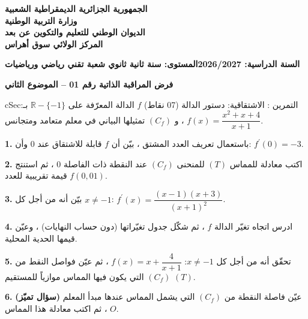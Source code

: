\documentclass[12pt,a4paper]{article}
\newenvironment{BOX}[2]{\begin{otherlanguage}{english}\begin{arbox}{#1}{#2}}{\end{arbox}\end{otherlanguage}}
\newcounter{exo}
\newenvironment{tamrin}[1]{\stepcounter{exo}\begin{BOX}{cSec}{التمرين \theexo: #1}}{\end{BOX}}
\newenvironment{LTR}{\begin{otherlanguage}{english}}{\end{otherlanguage}}
\newcommand{\R}{\mathbb{R}}
\newcommand{\QQ}[1]{\par\smallskip\textbf{#1.} }
\begin{document}
\begin{center}
{\large\bfseries الجمهورية الجزائرية الديمقراطية الشعبية}\\[2pt]
{\bfseries وزارة التربية الوطنية}\\[2pt]
{\bfseries الديوان الوطني للتعليم والتكوين عن بعد}\\[2pt]
{\bfseries المركز الولائي سوق أهراس}
\end{center}
\noindent\textbf{السنة الدراسية: 2026/2027}\hfill\textbf{المستوى: سنة ثانية ثانوي شعبة تقني رياضي ورياضيات}
\par\smallskip
\begin{LTR}
\begin{tcolorbox}[enhanced,colback=cSec,colframe=cSec,arc=2mm,halign=center,boxrule=0pt,top=6pt,bottom=6pt,before upper={\selectlanguage{arabic}}]
{\color{white}\Large\bfseries فرض المراقبة الذاتية رقم 01 -- الموضوع الثاني}
\end{tcolorbox}
\end{LTR}

\begin{tamrin}{الاشتقاقية: دستور الدالة (07 نقاط)}
$f$ الدالة المعرّفة على $\R-\{-1\}$ بـ: $f(x)=\dfrac{x^2+x+4}{x+1}$ ، و $(C_f)$ تمثيلها البياني في معلم متعامد ومتجانس.
\QQ{1} باستعمال تعريف العدد المشتق ، بيّن أن $f$ قابلة للاشتقاق عند $0$ وأن: $f^{\prime}(0)=-3$.
\QQ{2} اكتب معادلة للمماس $(T)$ للمنحنى $(C_f)$ عند النقطة ذات الفاصلة $0$ ، ثم استنتج قيمة تقريبية للعدد $f(0{,}01)$.
\QQ{3} بيّن أنه من أجل كل $x\neq-1$: $f^{\prime}(x)=\dfrac{(x-1)(x+3)}{(x+1)^2}$.
\QQ{4} ادرس اتجاه تغيّر الدالة $f$ ، ثم شكّل جدول تغيّراتها (دون حساب النهايات) ، وعيّن قيمها الحدية المحلية.
\QQ{5} تحقّق أنه من أجل كل $x\neq-1$: $f(x)=x+\dfrac4{x+1}$ ، ثم عيّن فواصل النقط من $(C_f)$ التي يكون فيها المماس موازياً للمستقيم $(T)$.
\QQ{6} \textbf{(سؤال تميّز)} عيّن فاصلة النقطة من $(C_f)$ التي يشمل المماس عندها مبدأ المعلم $O$ ، ثم اكتب معادلة هذا المماس.
\end{tamrin}
\end{document}
